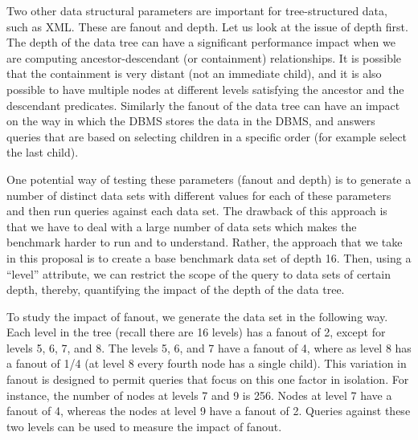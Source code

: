Two other data structural parameters are important for tree-structured
data, such as XML. These are fanout and depth. Let us look at the
issue of depth first. The depth of the data tree can have a
significant performance impact when we are computing
ancestor-descendant (or containment) relationships.  It is possible
that the containment is very distant (not an immediate child), and it
is also possible to have multiple nodes at different levels satisfying
the ancestor and the descendant predicates.  Similarly the fanout of
the data tree can have an impact on the way in which the DBMS stores
the data in the DBMS, and answers queries that are based on selecting
children in a specific order (for example select the last child).

One potential way of testing these parameters (fanout and depth) is to
generate a number of distinct data sets with different values for each
of these parameters and then run queries against each data set. The
drawback of this approach is that we have to deal with a large number
of data sets which makes the benchmark harder to run and to
understand. Rather, the approach that we take in this proposal is to
create a base benchmark data set of depth 16. Then, using a ``level''
attribute, we can restrict the scope of the query to data sets of
certain depth, thereby, quantifying the impact of the depth of the
data tree.

To study the impact of fanout, we generate the data set in the
following way. Each level in the tree (recall there are 16 levels) has
a fanout of 2, except for levels 5, 6, 7, and 8. The levels 5, 6, and
7 have a fanout of 4, where as level 8 has a fanout of 1/4 (at level 8
every fourth node has a single child). This variation in fanout is
designed to permit queries that focus on this one factor in isolation.
For instance, the number of nodes at levels 7 and 9 is 256. Nodes at
level 7 have a fanout of 4, whereas the nodes at level 9 have a fanout
of 2. Queries against these two levels can be used to measure the
impact of fanout.

